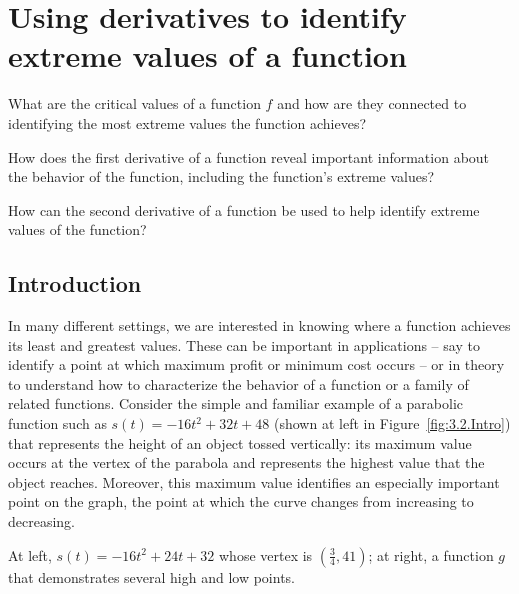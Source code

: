\section{Using derivatives to identify extreme values of a function} \label{S:3.2.Tests}

\begin{goals}
\item What are the critical values of a function $f$ and how are they connected to identifying the most extreme values the function achieves?
\item How does the first derivative of a function reveal important information about the behavior of the function, including the function's extreme values?
\item How can the second derivative of a function be used to help identify extreme values of the function?
\end{goals}

\subsection*{Introduction}

In many different settings, we are interested in knowing where a function achieves its least and greatest values.  These can be important in applications -- say to identify a point at which maximum profit or minimum cost occurs -- or in theory to understand how to characterize the behavior of a function or a family of related functions.  Consider the simple and familiar example of a parabolic function such as $s(t) = -16t^2 + 32t + 48$ (shown at left in Figure~\ref{fig:3.2.Intro}) that represents the height of an object tossed vertically:  its maximum value occurs at the vertex of the parabola and represents the highest value that the object reaches.  Moreover, this maximum value identifies an especially important point on the graph, the point at which the curve changes from increasing to decreasing.

\begin{marginfigure}[1cm] %
\caption{At left, $s(t) = -16t^2 + 24t + 32$ whose vertex is $(\frac{3}{4}, 41)$; at right, a function $g$ that demonstrates several high and low points.} \label{fig:3.2.Intro}
\end{marginfigure}

